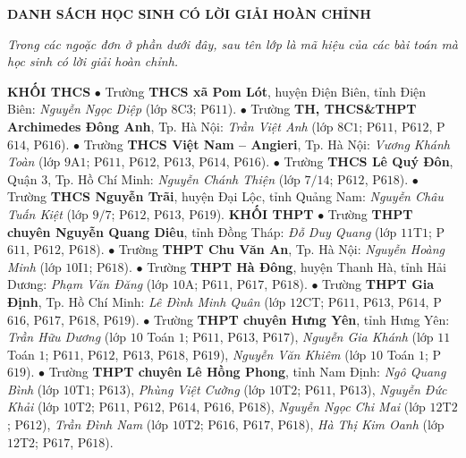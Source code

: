 \begin{center}
	\textbf{\color{thachthuctoanhoc}DANH SÁCH HỌC SINH CÓ LỜI GIẢI HOÀN CHỈNH}
\end{center}
\textit{Trong các ngoặc đơn ở phần dưới đây, sau tên lớp là mã hiệu của các bài toán mà học sinh có lời giải hoàn chỉnh.}
\begin{multicols}{2}
	\vskip 0.05cm
	\textbf{\color{thachthuctoanhoc}KHỐI THCS}
	\vskip 0.05cm
	$\bullet$ Trường \textbf{\color{thachthuctoanhoc}THCS xã Pom Lót}, huyện Điện Biên, tỉnh Điện Biên: \textit{Nguyễn Ngọc Diệp} (lớp $8$C$3$; P$611$).
	\vskip 0.05cm
	$\bullet$ Trường \textbf{\color{thachthuctoanhoc}TH, THCS\&THPT Archimedes Đông Anh}, Tp. Hà Nội:  \textit{Trần Việt Anh} (lớp $8$C$1$; P$611$, P$612$, P$614$, P$616$).
	\vskip 0.05cm
	$\bullet$ Trường \textbf{\color{thachthuctoanhoc}THCS Việt Nam -- Angieri}, Tp. Hà Nội: \textit{Vương Khánh Toàn} (lớp $9$A$1$; P$611$, P$612$, P$613$, P$614$, P$616$).
	\vskip 0.05cm
	$\bullet$ Trường \textbf{\color{thachthuctoanhoc}THCS Lê Quý Đôn}, Quận $3$, Tp. Hồ Chí Minh: \textit{Nguyễn Chánh Thiện} (lớp $7/14$; P$612$, P$618$).
	\vskip 0.05cm
	$\bullet$ Trường \textbf{\color{thachthuctoanhoc}THCS Nguyễn Trãi}, huyện Đại Lộc, tỉnh Quảng Nam: \textit{Nguyễn Châu Tuấn Kiệt} (lớp $9/7$; P$612$, P$613$, P$619$).
	\vskip 0.05cm
	\textbf{\color{thachthuctoanhoc}KHỐI THPT}
	\vskip 0.05cm
	$\bullet$ Trường \textbf{\color{thachthuctoanhoc}THPT chuyên Nguyễn Quang Diêu}, tỉnh Đồng Tháp: \textit{Đỗ Duy Quang} (lớp $11$T$1$; P$611$, P$612$, P$618$).
	\vskip 0.05cm
	$\bullet$ Trường \textbf{\color{thachthuctoanhoc}THPT Chu Văn An}, Tp. Hà Nội: \textit{Nguyễn Hoàng Minh} (lớp $10$I$1$; P$618$).
	\vskip 0.05cm
	$\bullet$ Trường \textbf{\color{thachthuctoanhoc}THPT Hà Đông}, huyện Thanh Hà, tỉnh Hải Dương: \textit{Phạm Văn Đăng} (lớp $10$A; P$611$, P$617$, P$618$).
	\vskip 0.05cm
	$\bullet$ Trường \textbf{\color{thachthuctoanhoc}THPT Gia Định}, Tp. Hồ Chí Minh: \textit{Lê Đình Minh Quân} (lớp $12$CT; P$611$, P$613$, P$614$, P$616$, P$617$, P$618$, P$619$).
	\vskip 0.05cm
	$\bullet$ Trường \textbf{\color{thachthuctoanhoc}THPT chuyên Hưng Yên}, tỉnh Hưng Yên: \textit{Trần Hữu Dương} (lớp $10$ Toán $1$; P$611$, P$613$, P$617$), \textit{Nguyễn Gia Khánh} (lớp $11$ Toán $1$; P$611$, P$612$, P$613$, P$618$, P$619$), \textit{Nguyễn Văn Khiêm} (lớp $10$ Toán $1$; P$619$).
	\vskip 0.05cm
	$\bullet$ Trường \textbf{\color{thachthuctoanhoc}THPT chuyên Lê Hồng Phong}, tỉnh Nam Định: \textit{Ngô Quang Bình} (lớp $10$T$1$; P$613$), \textit{Phùng Việt Cường} (lớp $10$T$2$; P$611$, P$613$), \textit{Nguyễn Đức Khải} (lớp $10$T$2$; P$611$, P$612$, P$614$, P$616$, P$618$), \textit{Nguyễn Ngọc Chi Mai} (lớp $12$T$2$; P$612$), \textit{Trần Đình Nam} (lớp $10$T$2$; P$616$, P$617$, P$618$), \textit{Hà Thị Kim Oanh} (lớp $12$T$2$; P$617$, P$618$).

\end{multicols}
